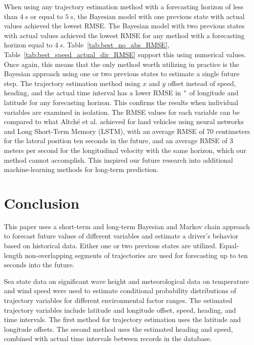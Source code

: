 \documentclass[preprint,12pt]{elsarticle}
\begin{document}
When using any trajectory estimation method with a forecasting horizon of less than $4 \ s$ or equal to $5 \ s$, the Bayesian model with one previous state with actual values achieved the lowest RMSE. The Bayesian model with two previous states with actual values achieved the lowest RMSE for any method with a forecasting horizon equal to $4 \ s$. Table~\ref{tab:best_no_abs_RMSE}, Table~\ref{tab:best_speed_actual_dir_RMSE} support this using numerical values. Once again, this means that the only method worth utilizing in practice is the Bayesian approach using one or two previous states to estimate a single future step. The trajectory estimation method using $x$ and $y$ offset instead of speed, heading, and the actual time interval has a lower RMSE in $\degree$ of longitude and latitude for any forecasting horizon. This confirms the results when individual variables are examined in isolation. The RMSE values for each variable can be compared to what Altché et al. \citep{altche2017lstm} achieved for land vehicles using neural networks and Long Short-Term Memory (LSTM), with an average RMSE of $70$ centimeters for the lateral position ten seconds in the future, and an average RMSE of $3$ meters per second for the longitudinal velocity with the same horizon, which our method cannot accomplish. This inspired our future research into additional machine-learning methods for long-term prediction.

\section{Conclusion}
\label{sec:Conclusion}

This paper uses a short-term and long-term Bayesian and Markov chain approach to forecast future values of different variables and estimate a driver's behavior based on historical data. Either one or two previous states are utilized. Equal-length non-overlapping segments of trajectories are used for forecasting up to ten seconds into the future.

Sea state data on significant wave height and meteorological data on temperature and wind speed were used to estimate conditional probability distributions of trajectory variables for different environmental factor ranges. The estimated trajectory variables include latitude and longitude offset, speed, heading, and time intervals. The first method for trajectory estimation uses the latitude and longitude offsets. The second method uses the estimated heading and speed, combined with actual time intervals between records in the database.
\end{document}

